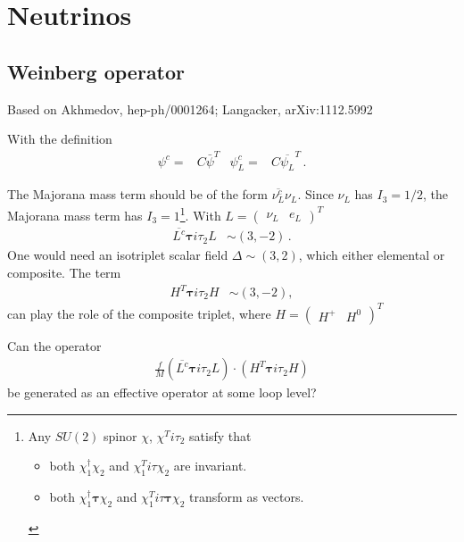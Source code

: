 \chapter{Neutrinos}

\section{Weinberg operator}


Based on Akhmedov, hep-ph/0001264; Langacker, arXiv:1112.5992

With the definition
\begin{align*}
  \psi^c=&C\bar{\psi}^T &\psi^c_L=&C\overline{\psi_L}^T\,.
\end{align*}

The Majorana mass term should be  of the form $\overline{\nu^{c}_L}\nu_L$. Since
$\nu_L$ has $I_3=1/2$, the Majorana mass term
has $I_3=1$\footnote{Any $SU(2)$ spinor $\chi$, $\chi^T i\tau_2$ satisfy that
  \begin{itemize}
  \item both $\chi_1^{\dagger}\chi_2$ and $\chi_1^T i\tau \chi_2$ are invariant.
  \item both $\chi_1^{\dagger}\boldsymbol{\tau}\chi_2$ and $\chi_1^T
    i\tau \boldsymbol{\tau}\chi_2$ transform as vectors.
  \end{itemize}
}. With $L=\begin{pmatrix}\nu_L&e_L\end{pmatrix}^T$
\begin{align*}
\overline{L^c}\boldsymbol{\tau}i\tau_2L&\sim \left( 3,-2 \right)\,.
\end{align*}
One would need an isotriplet scalar field $\Delta\sim (3,2)$, which
either elemental or composite. The term
\begin{align*}
  H^T \boldsymbol{\tau} i\tau_2H&\sim \left( 3,-2 \right),
\end{align*}
can play the role of the composite triplet, where $H=\begin{pmatrix}
H^+ & H^0\end{pmatrix}^T$

Can the operator
\begin{align*}
  \frac{f}{M}\left(\overline{L^c}\boldsymbol{\tau}i\tau_2L\right)\cdot
  \left( H^T \boldsymbol{\tau} i\tau_2H\right)
\end{align*}
be generated as an effective operator at some loop level?



